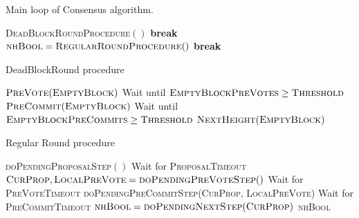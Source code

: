 \begin{algorithm}[p]
\caption{Main loop of \LayerTwo{} Consensus algorithm.}
\label{alg:alicenet_consensus}
\begin{algorithmic}[1]
            \State \textsc{DeadBlockRoundProcedure}$()$
            \State \textbf{break}
        \EndIf
        \State $\textsc{nhBool} = \textsc{RegularRoundProcedure}()$
            \State \textbf{break}
        \EndIf
    \EndFor
    \State \Return
\EndFunction
\end{algorithmic}
\end{algorithm}

\begin{algorithm}[p]
\caption{DeadBlockRound procedure}
\label{alg:dbr_proc}
\begin{algorithmic}[1]
    \State $\textsc{PreVote}(\textsc{EmptyBlock})$
    \State Wait until $\textsc{EmptyBlockPreVotes}\ge\textsc{Threshold}$
    \State $\textsc{PreCommit}(\textsc{EmptyBlock})$
    \State Wait until $\textsc{EmptyBlockPreCommits}\ge\textsc{Threshold}$
    \State $\textsc{NextHeight}(\textsc{EmptyBlock})$
    \State \Return
\EndFunction
\end{algorithmic}
\end{algorithm}

\begin{algorithm}[p]
\caption{Regular Round procedure}
\label{alg:rr_proc}
\begin{algorithmic}[1]
    \State \textsc{doPendingProposalStep}$()$
    \State Wait for \textsc{ProposalTimeout}
    \State $\textsc{CurProp}, \textsc{LocalPreVote}
        = \textsc{doPendingPreVoteStep}()$
    \State Wait for \textsc{PreVoteTimeout}
    \State \textsc{doPendingPreCommitStep}(\textsc{CurProp},
        \textsc{LocalPreVote})
    \State Wait for \textsc{PreCommitTimeout}
    \State $\textsc{nhBool} = \textsc{doPendingNextStep}(\textsc{CurProp})$
    \State \Return \textsc{nhBool}
\EndFunction
\end{algorithmic}
\end{algorithm}

